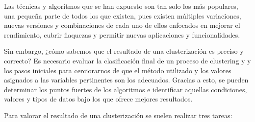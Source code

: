 \documentclass[10pt, a4paper]{article}
\begin{document}
Las técnicas y algoritmos que se han expuesto son tan solo los más populares, una pequeña parte de todos los que existen, pues existen múltiples variaciones, nuevas versiones y combinaciones de cada uno de ellos enfocados en mejorar el rendimiento, cubrir flaquezas y permitir nuevas aplicaciones y funcionalidades.

Sin embargo, ¿cómo sabemos que el resultado de una clusterización es preciso y correcto?  Es necesario evaluar la clasificación final de un proceso de clustering y y los pasos iniciales para cerciorarnos de que el método utilizado y los valores asignados a las variables pertinentes son los adecuados. Gracias a esto, se pueden determinar los puntos fuertes de los algoritmos e identificar aquellas condiciones, valores y tipos de datos bajo los que ofrece mejores resultados.

Para valorar el resultado de una clusterización se suelen realizar tres tareas:
\end{document}

